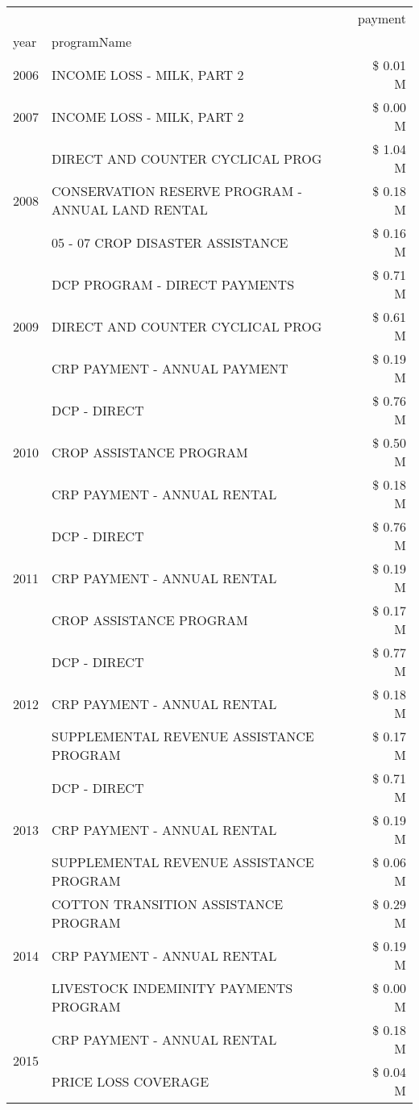 \begin{tabular}{llr}
\toprule
 &  & payment \\
year & programName &  \\
\midrule
2006 & INCOME LOSS - MILK, PART 2 & \$ 0.01 M \\
\cline{1-3}
2007 & INCOME LOSS - MILK, PART 2 & \$ 0.00 M \\
\cline{1-3}
\multirow[t]{3}{*}{2008} & DIRECT AND COUNTER CYCLICAL PROG & \$ 1.04 M \\
 & CONSERVATION RESERVE PROGRAM - ANNUAL LAND RENTAL & \$ 0.18 M \\
 & 05 - 07 CROP DISASTER ASSISTANCE & \$ 0.16 M \\
\cline{1-3}
\multirow[t]{3}{*}{2009} & DCP PROGRAM - DIRECT PAYMENTS & \$ 0.71 M \\
 & DIRECT AND COUNTER CYCLICAL PROG & \$ 0.61 M \\
 & CRP PAYMENT - ANNUAL PAYMENT & \$ 0.19 M \\
\cline{1-3}
\multirow[t]{3}{*}{2010} & DCP - DIRECT & \$ 0.76 M \\
 & CROP ASSISTANCE PROGRAM & \$ 0.50 M \\
 & CRP PAYMENT - ANNUAL RENTAL & \$ 0.18 M \\
\cline{1-3}
\multirow[t]{3}{*}{2011} & DCP - DIRECT & \$ 0.76 M \\
 & CRP PAYMENT - ANNUAL RENTAL & \$ 0.19 M \\
 & CROP ASSISTANCE PROGRAM & \$ 0.17 M \\
\cline{1-3}
\multirow[t]{3}{*}{2012} & DCP - DIRECT & \$ 0.77 M \\
 & CRP PAYMENT - ANNUAL RENTAL & \$ 0.18 M \\
 & SUPPLEMENTAL REVENUE ASSISTANCE PROGRAM & \$ 0.17 M \\
\cline{1-3}
\multirow[t]{3}{*}{2013} & DCP - DIRECT & \$ 0.71 M \\
 & CRP PAYMENT - ANNUAL RENTAL & \$ 0.19 M \\
 & SUPPLEMENTAL REVENUE ASSISTANCE PROGRAM & \$ 0.06 M \\
\cline{1-3}
\multirow[t]{3}{*}{2014} & COTTON TRANSITION ASSISTANCE PROGRAM & \$ 0.29 M \\
 & CRP PAYMENT - ANNUAL RENTAL & \$ 0.19 M \\
 & LIVESTOCK INDEMINITY PAYMENTS PROGRAM & \$ 0.00 M \\
\cline{1-3}
\multirow[t]{3}{*}{2015} & CRP PAYMENT - ANNUAL RENTAL & \$ 0.18 M \\
 & PRICE LOSS COVERAGE & \$ 0.04 M \\

\end{tabular}
